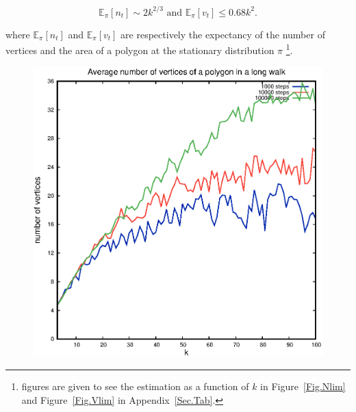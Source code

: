 \documentclass[a4paper]{article}
\begin{document}
\begin{equation}
  \mathbb{E}_\pi[n_t] \sim 2k^{2/3} \text{ and } \mathbb{E}_\pi[v_t] \leq 0.68k^2.
\end{equation}

where $\mathbb{E}_\pi[n_t]$ and $\mathbb{E}_\pi[v_t]$ are respectively the expectancy of the number of vertices and the area of a polygon at the stationary distribution $\pi$ \footnote{figures are given to see the estimation as a function of $k$ in Figure~\ref{Fig.Nlim} and Figure~\ref{Fig.Vlim} in Appendix~\ref{Sec.Tab}.}.

\begin{figure}[t]
  \begin{center}
    \begin{minipage}[c]{.45\linewidth}
      \includegraphics[scale=.4]{npoint}
    \end{minipage}
    \begin{minipage}[c]{.45\linewidth}

\end{minipage}
\end{center}
\end{figure}
\end{document}
